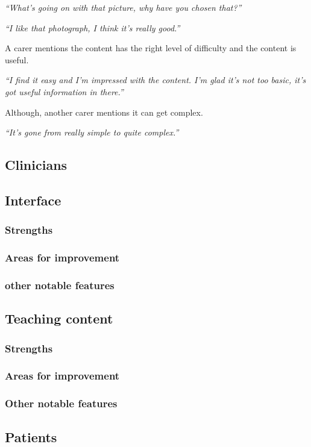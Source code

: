 \documentclass{sigchi}
\begin{document}
\textit{“What’s going on with that picture, why have you chosen that?”}

\textit{“I like that photograph, I think it’s really good.”}

A carer mentions the content has the right level of difficulty and the content is useful. 

\textit{“I find it easy and I’m impressed with the content. I’m glad it’s not too basic, it’s got useful information in there.”}

Although, another carer mentions it can get complex.

\textit{“It’s gone from really simple to quite complex.”}

\subsection{Clinicians}

\subsection{Interface}
\subsubsection{Strengths}
\subsubsection{Areas for improvement}
\subsubsection{other notable features}

\subsection{Teaching content}
\subsubsection{Strengths}
\subsubsection{Areas for improvement}
\subsubsection{Other notable features}

\subsection{Patients}
\end{document}
